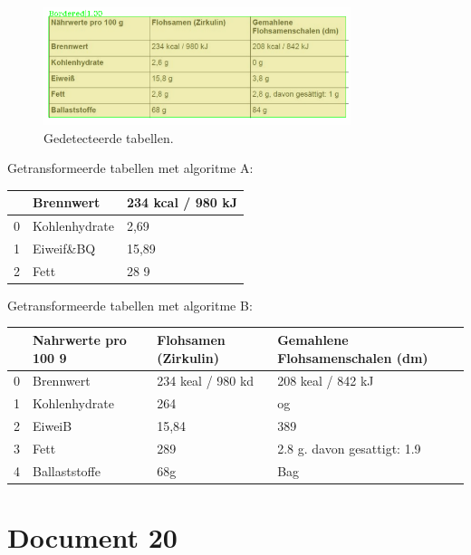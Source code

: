 \begin{figure}[H]
    \centering
    \includegraphics[width=0.8\textwidth]{test-resultaten/19/detected_tables.png}
    \caption{Gedetecteerde tabellen.}
\end{figure}

Getransformeerde tabellen met algoritme A:

\begin{tabular}{lll}
\toprule
{} &      Brennwert & 234 kcal / 980 kJ \\
\midrule
0 &  Kohlenhydrate &              2,69 \\
1 &      Eiweif\&BQ &             15,89 \\
2 &           Fett &              28 9 \\
\bottomrule
\end{tabular}

Getransformeerde tabellen met algoritme B:

\begin{tabular}{llll}
\toprule
{} & Nahrwerte pro 100 9 & Flohsamen (Zirkulin) & Gemahlene Flohsamenschalen (dm) \\
\midrule
0 &           Brennwert &    234 keal / 980 kd &               208 keal / 842 kJ \\
1 &       Kohlenhydrate &                  264 &                              og \\
2 &              EiweiB &                15,84 &                             389 \\
3 &                Fett &                  289 &     2.8 g. davon gesattigt: 1.9 \\
4 &       Ballaststoffe &                  68g &                             Bag \\
\bottomrule
\end{tabular}
\section{Document 20}

